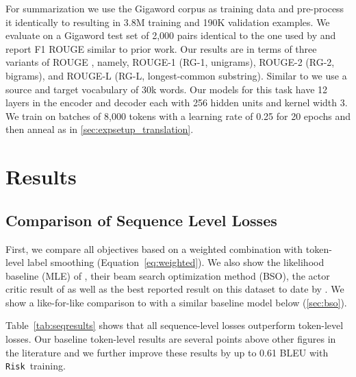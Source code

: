 \documentclass[11pt,a4paper]{article}
\newcommand{\Risk}{\texttt{Risk}}
\begin{document}
For summarization we use the Gigaword corpus as training data \cite{graff2003english} and pre-process it identically to \citet{rush2015abs} resulting in 3.8M training and 190K validation examples.
We evaluate on a Gigaword test set of 2,000 pairs identical to the one used by \citet{rush2015abs} and report F1 ROUGE similar to prior work.
Our results are in terms of three variants of ROUGE \cite{lin2004rouge}, namely, ROUGE-1 (RG-1, unigrams), ROUGE-2 (RG-2, bigrams), and ROUGE-L (RG-L, longest-common substring).
Similar to \citet{ayana2016neural} we use a source and target vocabulary of 30k words.
Our models for this task have 12 layers in the encoder and decoder each with 256 hidden units and kernel width 3.
We train on batches of 8,000 tokens with a learning rate of 0.25 for 20 epochs and then anneal as in \textsection\ref{sec:expsetup_translation}.


\section{Results}
\label{sec:results}


\subsection{Comparison of Sequence Level Losses}
\label{sec:seqlosscmp}

First, we compare all objectives based on a weighted combination with token-level label smoothing (Equation~\ref{eq:weighted}).
We also show the likelihood baseline (MLE) of \citet{wiseman2016acl}, their beam search optimization method (BSO), the actor critic result of \citet{bahdanau2016ac} as well as the best reported result on this dataset to date by \citet{huang2017npbmt}.
We show a like-for-like comparison to \citet{wiseman2016acl} with a similar baseline model below (\textsection\ref{sec:bso}).

Table~\ref{tab:seqresults} shows that all sequence-level losses outperform token-level losses.
Our baseline token-level results are several points above other figures in the literature and we further improve these results by up to 0.61 BLEU with \Risk~training.
\end{document}

